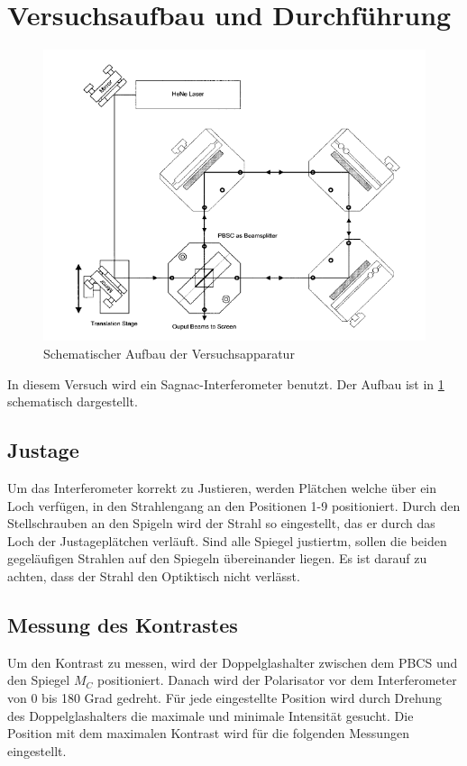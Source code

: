 \section{Versuchsaufbau und Durchführung}

\begin{figure}[h]
\centering
\includegraphics[scale=0.8]{img/aufbau.PNG}
\caption{Schematischer Aufbau der Versuchsapparatur \cite{FP}}
\label{aufbau}
\end{figure}


In diesem Versuch wird ein Sagnac-Interferometer benutzt. Der Aufbau ist in \ref{aufbau} schematisch dargestellt.

\subsection{Justage}
Um das Interferometer korrekt zu Justieren, werden Plätchen welche über ein Loch verfügen, in den Strahlengang an den Positionen 1-9 positioniert. Durch den Stellschrauben an den Spigeln wird der Strahl
so eingestellt, das er durch das Loch der Justageplätchen verläuft. Sind alle Spiegel justiertm, sollen die beiden gegeläufigen Strahlen auf den Spiegeln übereinander liegen.
Es ist darauf zu achten, dass der Strahl den Optiktisch nicht verlässt.


\subsection{Messung des Kontrastes}
Um den Kontrast zu messen, wird der Doppelglashalter zwischen dem PBCS und den Spiegel $M_C$ positioniert. Danach wird der Polarisator vor dem Interferometer
von 0 bis 180 Grad gedreht. Für jede eingestellte Position wird durch Drehung des Doppelglashalters die maximale und minimale Intensität gesucht.
Die Position mit dem maximalen Kontrast wird für die folgenden Messungen eingestellt.

